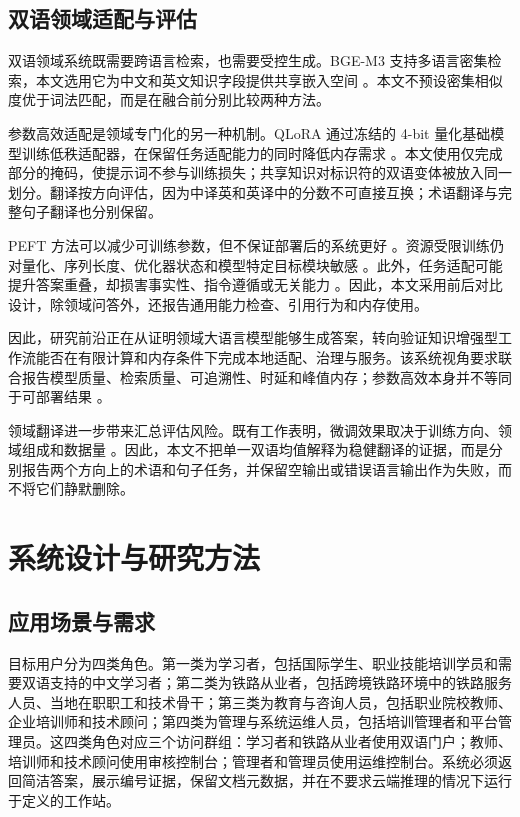 \subsection{双语领域适配与评估}

双语领域系统既需要跨语言检索，也需要受控生成。BGE-M3 支持多语言密集检索，本文选用它为中文和英文知识字段提供共享嵌入空间 \citep{chen2024bgem3}。本文不预设密集相似度优于词法匹配，而是在融合前分别比较两种方法。

参数高效适配是领域专门化的另一种机制。QLoRA 通过冻结的 4-bit 量化基础模型训练低秩适配器，在保留任务适配能力的同时降低内存需求 \citep{dettmers2023qlora}。本文使用仅完成部分的掩码，使提示词不参与训练损失；共享知识对标识符的双语变体被放入同一划分。翻译按方向评估，因为中译英和英译中的分数不可直接互换；术语翻译与完整句子翻译也分别保留。

PEFT 方法可以减少可训练参数，但不保证部署后的系统更好 \citep{ding2023peft,wang2025peft}。资源受限训练仍对量化、序列长度、优化器状态和模型特定目标模块敏感 \citep{lv2024full}。此外，任务适配可能提升答案重叠，却损害事实性、指令遵循或无关能力 \citep{tian2024factuality,barnett2024finetuning}。因此，本文采用前后对比设计，除领域问答外，还报告通用能力检查、引用行为和内存使用。

因此，研究前沿正在从证明领域大语言模型能够生成答案，转向验证知识增强型工作流能否在有限计算和内存条件下完成本地适配、治理与服务。该系统视角要求联合报告模型质量、检索质量、可追溯性、时延和峰值内存；参数高效本身并不等同于可部署结果 \citep{ding2023peft,lv2024full,wang2025peft}。

领域翻译进一步带来汇总评估风险。既有工作表明，微调效果取决于训练方向、领域组成和数据量 \citep{hu2024translation,vieira2024translation,zheng2024translation}。因此，本文不把单一双语均值解释为稳健翻译的证据，而是分别报告两个方向上的术语和句子任务，并保留空输出或错误语言输出作为失败，而不将它们静默删除。

\section{系统设计与研究方法}

\subsection{应用场景与需求}

目标用户分为四类角色。第一类为学习者，包括国际学生、职业技能培训学员和需要双语支持的中文学习者；第二类为铁路从业者，包括跨境铁路环境中的铁路服务人员、当地在职职工和技术骨干；第三类为教育与咨询人员，包括职业院校教师、企业培训师和技术顾问；第四类为管理与系统运维人员，包括培训管理者和平台管理员。这四类角色对应三个访问群组：学习者和铁路从业者使用双语门户；教师、培训师和技术顾问使用审核控制台；管理者和管理员使用运维控制台。系统必须返回简洁答案，展示编号证据，保留文档元数据，并在不要求云端推理的情况下运行于定义的工作站。

